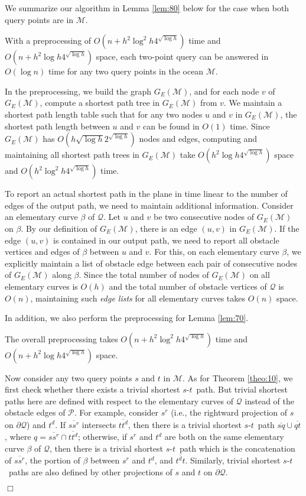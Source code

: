 \documentclass[english,runningheads,11pt]{llncs}
\def\calP{\mathcal{P}}
\def\calM{\mathcal{M}}
\def\calQ{\mathcal{Q}}
\def\st{$s$-$t$}
\newenvironment{proof}{\noindent {\textbf{Proof:}}\rm}{\hfill $\Box$\rm}
\begin{document}
We summarize our algorithm in Lemma
\ref{lem:80} below for the case when both query points are in $\calM$.

\begin{lemma}\label{lem:80}
With a preprocessing of $O(n+h^2\log^2 h 4^{\sqrt{\log h}})$ time and
$O(n+h^2\log h4^{\sqrt{\log h}})$ space,
each two-point query can be answered in $O(\log n)$
time for any two query points in the ocean $\calM$.
\end{lemma}
\begin{proof}
In the preprocessing, we build the graph $G_E(\calM)$, and for each node
$v$ of $G_E(\calM)$, compute a shortest path tree in $G_E(\calM)$
from $v$. We maintain a shortest path length table such that for
any two nodes $u$ and $v$ in $G_E(\calM)$, the shortest path length
between $u$ and $v$ can  be found in $O(1)$ time. Since
$G_E(\calM)$ has $O(h\sqrt{\log h}2^{\sqrt{\log h}})$ nodes and edges, computing and maintaining
all shortest path trees in $G_E(\calM)$ take $O(h^2\log h4^{\sqrt{\log h}})$ space and
$O(h^2\log^2 h4^{\sqrt{\log h}})$ time.


To report an actual shortest path in the plane in time linear to the number of edges of
the output path, we need to maintain additional information. Consider an elementary curve
$\beta$ of $\calQ$. Let $u$ and $v$ be two consecutive nodes of $G_E(\calM)$ on $\beta$.
By our definition of $G_E(\calM)$, there is an edge $(u,v)$
in $G_E(\calM)$. If the edge $(u,v)$ is contained in our output path, we
need to report all obstacle vertices and edges of $\beta$ between $u$ and
$v$. For this, on each elementary curve $\beta$, we explicitly
maintain a list of obstacle edge between each pair of consecutive nodes of
$G_E(\calM)$ along $\beta$. Since the total number of nodes of $G_E(\calM)$
on all elementary curves is $O(h)$ and the total number of obstacle
vertices of $\calQ$ is $O(n)$, maintaining such {\em edge lists} for
all elementary curves takes $O(n)$ space.

In addition, we also perform the preprocessing for Lemma \ref{lem:70}.

The overall preprocessing takes $O(n+h^2\log^{2} h 4^{\sqrt{\log h}})$ time and
$O(n+h^2\log h4^{\sqrt{\log h}})$ space.


Now consider any two query points $s$ and $t$ in $\calM$. As
for Theorem \ref{theo:10}, we first check whether there
exists a trivial shortest \st\ path. But trivial shortest paths
here are defined with respect to the elementary curves of $\calQ$ instead of the obstacle
edges of $\calP$. For example, consider $s^r$ (i.e., the rightward projection of
$s$ on $\partial\calQ$) and $t^d$. If $\overline{ss^r}$
intersects $\overline{tt^d}$, then there is a trivial shortest \st\
path $\overline{sq}\cup \overline{qt}$, where $q=\overline{ss^r}\cap
\overline{tt^d}$; otherwise, if $s^r$ and $t^d$ are both on the same
elementary curve $\beta$ of $\calQ$, then there is a trivial shortest
\st\ path which is the concatenation of $\overline{ss^r}$, the
portion of $\beta$ between $s^r$ and $t^d$, and $\overline{t^dt}$.
Similarly, trivial shortest \st\ paths are also defined by other
projections of $s$ and $t$ on $\partial\calQ$.


\end{proof}
\end{document}

